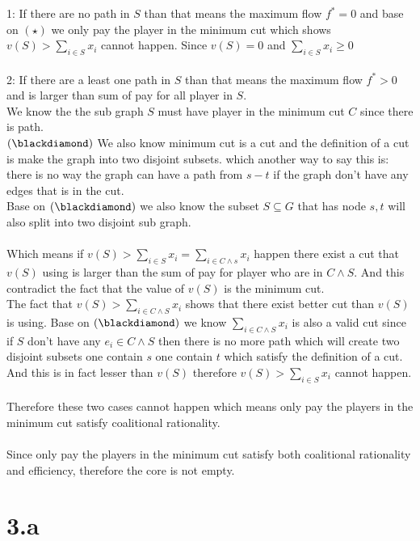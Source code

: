 \documentclass{article}
\begin{document}
1: If there are no path in $S$ than that means the maximum flow $f^* = 0$ and base on $(\star)$ we only pay the player in the minimum cut which shows $v(S) > \sum_{i \in S} x_i$ cannot happen. Since $v(S) = 0$ and $\sum_{i \in S} x_i \geq 0$\\\\
2: If there are a least one path in $S$ than that means the maximum flow $f^* > 0$ and is larger than sum of pay for all player in $S$.\\
We know the the sub graph $S$ must have player in the minimum cut  $C$ since there is path.\\
$(\blackdiamond)$ We also know minimum cut is a cut and the definition of a cut is make the graph into two disjoint subsets. which another way to say this is: there is no way the graph can have a path from $s-t$ if the graph don't have any edges that is in the cut.\\
Base on $(\blackdiamond)$ we also know the subset $S \subseteq G$ that has node $s,t$ will also split into two disjoint sub graph.\\\\
Which means if $v(S) > \sum_{i \in S} x_i = \sum_{i \in C\wedge s} x_i$ happen there exist a cut that $v(S)$ using is larger than the sum of pay for player who are in $C \wedge S$. And this contradict the fact that the value of $v(S)$ is the minimum cut.\\
The fact that $v(S) > \sum_{i \in C\wedge S}x_i$ shows that there exist better cut than $v(S)$ is using. Base on $(\blackdiamond)$ we know $\sum_{i \in C\wedge S}x_i$ is also a valid cut since if $S$ don't have any $e_i \in C\wedge S$ then there is no more path which will create two disjoint subsets one contain $s$ one contain $t$ which satisfy the definition of a cut. And this is in fact lesser than $v(S)$ therefore $v(S) > \sum_{i \in S}x_i$ cannot happen.\\\\
Therefore these two cases cannot happen which means only pay the players in the minimum cut satisfy coalitional rationality.\\\\
Since only pay the players in the minimum cut satisfy both coalitional rationality and efficiency, therefore the core is not empty.





\newpage
\section{3.a}
\end{document}
